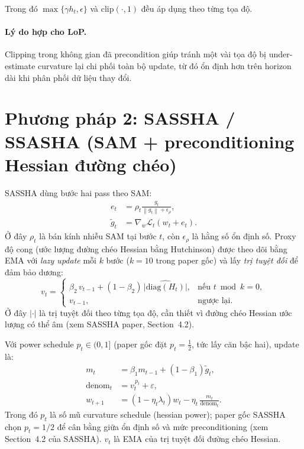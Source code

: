 \documentclass[11pt]{article}
\newcommand{\norm}[1]{\left\lVert #1 \right\rVert}
\newcommand{\diag}{\mathrm{diag}}
\begin{document}
\noindent Trong đó $\max\{\gamma h_t,\epsilon\}$ và $\mathrm{clip}(\cdot,1)$ đều áp dụng theo từng tọa độ.

\paragraph{Lý do hợp cho LoP.}
Clipping trong không gian đã precondition giúp tránh một vài tọa độ bị under-estimate curvature lại chi phối toàn bộ update, từ đó ổn định hơn trên horizon dài khi phân phối dữ liệu thay đổi.

\section{Phương pháp 2: SASSHA / SSASHA (SAM + preconditioning Hessian đường chéo)}
SASSHA dùng bước hai pass theo SAM:
\begin{align}
e_t &= \rho_t\frac{g_t}{\norm{g_t}+\epsilon_\rho},\\
\tilde g_t &= \nabla_w \mathcal{L}_t(w_t+e_t).
\end{align}
Ở đây $\rho_t$ là bán kính nhiễu SAM tại bước $t$, còn $\epsilon_\rho$ là hằng số ổn định số.
Proxy độ cong (ước lượng đường chéo Hessian bằng Hutchinson) được theo dõi bằng EMA
với \emph{lazy update} mỗi $k$ bước ($k{=}10$ trong paper gốc) và lấy \emph{trị tuyệt đối}
để đảm bảo dương:
\begin{equation}
v_t =
\begin{cases}
\beta_2\,v_{t-1}+(1-\beta_2)\,\big|\widehat{\diag(H_t)}\big|, & \text{nếu } t\bmod k=0,\\
v_{t-1}, & \text{ngược lại.}
\end{cases}
\end{equation}
Ở đây $|\cdot|$ là trị tuyệt đối theo từng tọa độ, cần thiết vì đường chéo Hessian ước lượng có thể âm
(xem SASSHA paper, Section~4.2).

Với power schedule $p_t \in (0,1]$ (paper gốc đặt $p_t=\tfrac12$, tức lấy căn bậc hai), update là:
\begin{equation}
\begin{aligned}
m_t &= \beta_1 m_{t-1} + (1-\beta_1)\tilde g_t,\\
\mathrm{denom}_t &= v_t^{\,p_t}+\varepsilon,\\
w_{t+1} &= (1-\eta_t\lambda_t)w_t - \eta_t\,\frac{m_t}{\mathrm{denom}_t}.
\end{aligned}
\end{equation}
Trong đó $p_t$ là số mũ curvature schedule (hessian power); paper gốc SASSHA chọn $p_t=1/2$
để cân bằng giữa ổn định số và mức preconditioning (xem Section~4.2 của SASSHA).
$v_t$ là EMA của trị tuyệt đối đường chéo Hessian.
\end{document}
